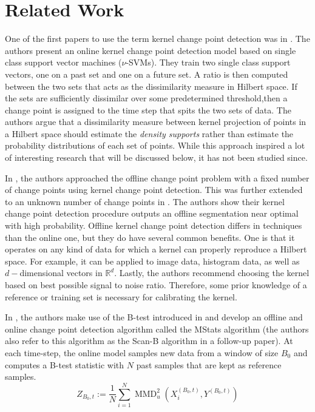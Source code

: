 \section{Related Work}
\label{related_works}
One of the first papers to use the term kernel change point detection was in \cite{desobry2005online}. The authors present an online kernel change point detection model based on single class support vector machines ($\nu$-SVMs). They train two single class support vectors, one on a past set and one on a future set. A ratio is then computed between the two sets that acts as the dissimilarity measure in Hilbert space. If the sets are sufficiently dissimilar over some predetermined threshold,then a change point is assigned to the time step that spits the two sets of data. The authors argue that a dissimilarity measure between kernel projection of points in a Hilbert space should estimate the \textit{density supports} rather than estimate the probability distributions of each set of points. While this approach inspired a lot of interesting research that will be discussed below, it has not been studied since.

In \cite{harchaoui2007retrospective}, the authors approached the offline change point problem with a fixed number of change points using kernel change point detection. This was further extended to an unknown number of change points in \cite{arlot2012kernel}. The authors show their kernel change point detection procedure outputs an offline segmentation near optimal with high probability. Offline kernel change point detection differs in techniques than the online one, but they do have several common benefits. One is that it operates on any kind of data for which a kernel can properly reproduce a Hilbert space. For example, it can be applied to image data, histogram data, as well as $d-$dimensional vectors in $\mathbb{R}^d$. Lastly, the authors recommend choosing the kernel based on best possible signal to noise ratio. Therefore, some prior knowledge of a reference or training set is necessary for calibrating the kernel. 

In  \cite{li2015m}, the authors make use of the B-test introduced in \cite{zaremba2013b} and develop an offline and online change point detection algorithm called the MStats algorithm (the authors also refer to this algorithm as the Scan-B algorithm in a follow-up paper). At each time-step, the online model samples new data from a window of size $B_0$ and computes a B-test statistic with $N$ past samples that are kept as reference samples. 
\begin{equation}
Z_{B_{0}, t}:=\frac{1}{N} \sum_{i=1}^{N} \operatorname{MMD}_{u}^{2}\left(X_{i}^{\left(B_{0}, t\right)}, Y^{\left(B_{0}, t\right)}\right)
\end{equation}

